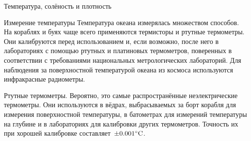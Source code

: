 \begin{chapter}{Температура, солёность и плотность}
\begin{section}{Измерение температуры}
Температура океана измерялась множеством способов. На кораблях и
буях чаще всего применяются термисторы и ртутные термометры. Они калибруются 
перед использованием и, если возможно, после него в лабораториях с помощью 
ртутных и платиновых термометров, поверенных в
соответствии с требованиями национальных метрологических
лабораторий. Для наблюдения за поверхностной температурой
океана из космоса используются инфракрасные радиометры.
%

\begin{paragraph}{Ртутные термометры.} 
Вероятно, это самые распространённые неэлектрические термометры. Они
используются в вёдрах, выбрасываемых за борт корабля для измерения
поверхностной температуры, в батометрах для измерений температуры на
глубине и в лабораториях для калибровки других термометров. Точность
их при хорошей калибровке составляет~$\pm{0.001}^\circ\mbox{C}$.
%


\end{paragraph}
\end{section}
\end{chapter}
